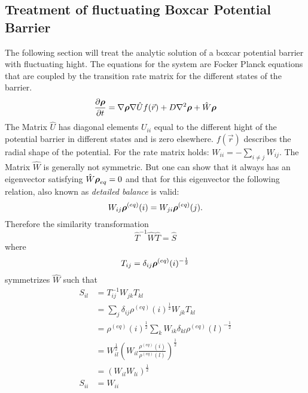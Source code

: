 \subsection{Treatment of fluctuating Boxcar Potential Barrier}

The following section will treat the analytic solution of a boxcar potential barrier with fluctuating hight. The equations for the system are Focker Planck equations that are coupled by the transition rate matrix for the different states of the barrier.
\begin{equation}
    \frac{\partial \boldsymbol{\mathbf{\rho}}}{\partial t} = \nabla \boldsymbol{\mathbf{\rho}} \nabla \hat{U} f(\vec{r}) + D\nabla^2\boldsymbol{\mathbf{\rho}} + \hat{W} \boldsymbol{\mathbf{\rho}} 
    \label{Rection_Diffusion}
\end{equation}
The Matrix $\hat{U}$ has diagonal elements $U_{ii}$ equal to the different hight of the potential barrier in different states and is zero elsewhere. $f(\vec{r})$ describes the radial shape of the potential. For the rate matrix holds: $W_{ii} = -\sum_{i \ne j} W_{ij}$. The Matrix $\hat{W}$ is generally not symmetric. But one can show that it always has an eigenvector satisfying $\hat{W} \boldsymbol{\mathbf{\rho}}_{eq} = 0$ and that for this eigenvector the following relation, also known as {\it detailed balance} is valid:
\begin{equation}
    W_{ij} \boldsymbol{\mathbf{\rho}}^{(eq)}(i) = W_{ji} \boldsymbol{\mathbf{\rho}}^{(eq)}(j).
    \label{detailled_ballance}
\end{equation}
Therefore the similarity transformation
\begin{equation}
    \hat{T}^{-1}\hat{W}\hat{T} = \hat{S}
\end{equation}
where
\begin{equation}
    T_{ij} =\delta_{ij} \boldsymbol{\mathbf{\rho}}^{(eq)}(i)^{-\frac{1}{2}}
    \label{similarity_transform}
\end{equation}
symmetrizes $\hat{W}$ such that
\begin{align}
    S_{il} &= T^{-1}_{ij} W_{jk} T_{kl} \\ \nonumber
    &= \sum_j \delta_{ij} \rho^{(eq)}(i)^{\frac{1}{2}} W_{jk} T_{kl} \\ \nonumber
    &= \rho^{(eq)}(i)^{\frac{1}{2}} \sum_{k} W_{ik} \delta_{kl} \rho^{(eq)}(l)^{-\frac{1}{2}} \\ \nonumber
    &= W_{il}^{\frac{1}{2}} \left( W_{il} \frac{\rho^{(eq)}(i)}{\rho^{(eq)}(l)} \right)^{\frac{1}{2}} \\ \nonumber
    &= \left(W_{il} W_{li}\right)^{\frac{1}{2}} \\ \nonumber
    S_{ii} &= W_{ii} 
\end{align}
